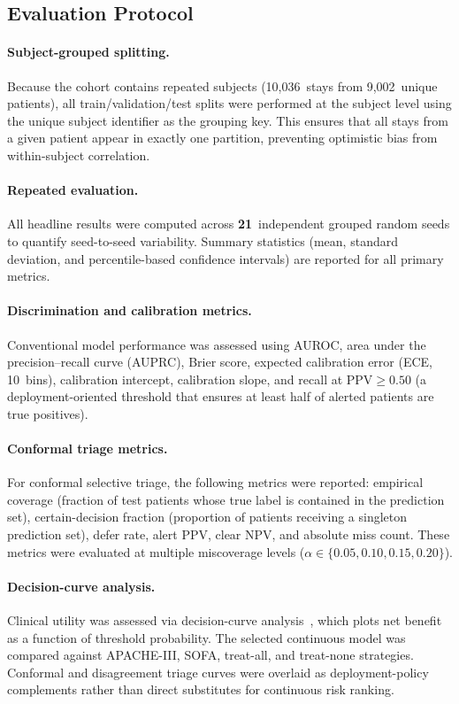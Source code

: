 \documentclass[11pt]{article}
\begin{document}
\subsection{Evaluation Protocol}\label{sec:evaluation}

\paragraph{Subject-grouped splitting.}
Because the cohort contains repeated subjects (10,036~stays from 9,002~unique
patients), all train/validation/test splits were performed at the subject level
using the unique subject identifier as the grouping key.  This ensures that all stays
from a given patient appear in exactly one partition, preventing optimistic bias
from within-subject correlation.

\paragraph{Repeated evaluation.}
All headline results were computed across \textbf{21}~independent grouped random
seeds to quantify seed-to-seed variability.  Summary statistics (mean, standard
deviation, and percentile-based confidence intervals) are reported for all
primary metrics.

\paragraph{Discrimination and calibration metrics.}
Conventional model performance was assessed using AUROC, area under the
precision--recall curve (AUPRC), Brier score, expected calibration error (ECE,
10~bins), calibration intercept, calibration slope, and recall at
$\text{PPV} \ge 0.50$ (a deployment-oriented threshold that ensures at least
half of alerted patients are true positives).

\paragraph{Conformal triage metrics.}
For conformal selective triage, the following metrics were reported: empirical coverage (fraction of
test patients whose true label is contained in the prediction set), certain-decision
fraction (proportion of patients receiving a singleton prediction set),
defer rate, alert PPV, clear NPV, and absolute miss count.  These metrics were
evaluated at multiple miscoverage levels ($\alpha \in \{0.05, 0.10, 0.15, 0.20\}$).

\paragraph{Decision-curve analysis.}
Clinical utility was assessed via decision-curve analysis~\citep{Vickers2006},
which plots net benefit as a function of threshold probability.  The selected
continuous model was compared against APACHE-III, SOFA, treat-all, and
treat-none strategies.  Conformal and disagreement triage curves were overlaid
as deployment-policy complements rather than direct substitutes for continuous
risk ranking.
\end{document}
